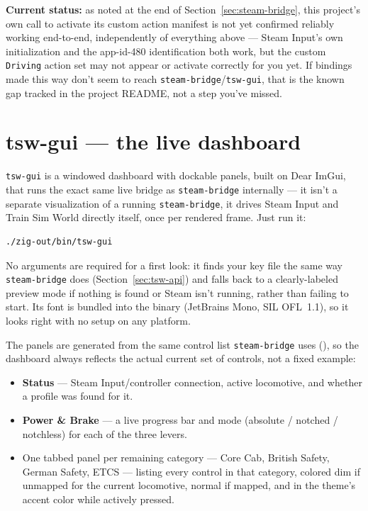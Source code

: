 \documentclass[11pt,a4paper]{article}
\newcommand{\code}[1]{\texttt{#1}}
\begin{document}
\textbf{Current status:} as noted at the end of
Section~\ref{sec:steam-bridge}, this project's own call to activate its
custom action manifest is not yet confirmed reliably working end-to-end,
independently of everything above --- Steam Input's own initialization
and the app-id-480 identification both work, but the custom \code{Driving}
action set may not appear or activate correctly for you yet. If bindings
made this way don't seem to reach \code{steam-bridge}/\code{tsw-gui}, that
is the known gap tracked in the project README, not a step you've missed.

\section{tsw-gui --- the live dashboard}
\label{sec:tsw-gui}

\code{tsw-gui} is a windowed dashboard with dockable panels, built on Dear
ImGui, that runs the exact same live bridge as \code{steam-bridge}
internally --- it isn't a separate visualization of a running
\code{steam-bridge}, it drives Steam Input and Train Sim World directly
itself, once per rendered frame. Just run it:

\begin{lstlisting}
./zig-out/bin/tsw-gui
\end{lstlisting}

No arguments are required for a first look: it finds your key file the
same way \code{steam-bridge} does (Section~\ref{sec:tsw-api}) and falls
back to a clearly-labeled preview mode if nothing is found or Steam isn't
running, rather than failing to start. Its font is bundled into the
binary (JetBrains Mono, SIL OFL~1.1), so it looks right with no setup on
any platform.

The panels are generated from the same control list \code{steam-bridge}
uses (), so the dashboard always reflects the
actual current set of controls, not a fixed example:

\begin{itemize}[leftmargin=1.5em]
    \item \textbf{Status} --- Steam Input/controller connection, active
    locomotive, and whether a profile was found for it.
    \item \textbf{Power \& Brake} --- a live progress bar and mode
    (absolute / notched / notchless) for each of the three levers.
    \item One tabbed panel per remaining category --- Core Cab, British
    Safety, German Safety, ETCS --- listing every control in that
    category, colored dim if unmapped for the current locomotive, normal
    if mapped, and in the theme's accent color while actively pressed.
\end{itemize}
\end{document}
